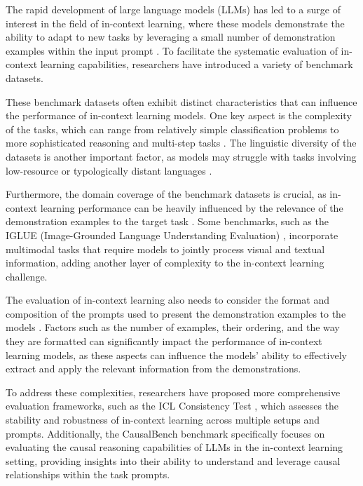 \documentclass[11pt]{article}
\begin{document}
The rapid development of large language models (LLMs) has led to a surge of interest in the field of in-context learning, where these models demonstrate the ability to adapt to new tasks by leveraging a small number of demonstration examples within the input prompt \cite{ref278,ref4}. To facilitate the systematic evaluation of in-context learning capabilities, researchers have introduced a variety of benchmark datasets.

These benchmark datasets often exhibit distinct characteristics that can influence the performance of in-context learning models. One key aspect is the complexity of the tasks, which can range from relatively simple classification problems to more sophisticated reasoning and multi-step tasks \cite{ref279,ref280}. The linguistic diversity of the datasets is another important factor, as models may struggle with tasks involving low-resource or typologically distant languages \cite{ref281}.

Furthermore, the domain coverage of the benchmark datasets is crucial, as in-context learning performance can be heavily influenced by the relevance of the demonstration examples to the target task \cite{ref282}. Some benchmarks, such as the IGLUE (Image-Grounded Language Understanding Evaluation) \cite{ref245}, incorporate multimodal tasks that require models to jointly process visual and textual information, adding another layer of complexity to the in-context learning challenge.

The evaluation of in-context learning also needs to consider the format and composition of the prompts used to present the demonstration examples to the models \cite{ref48,ref15}. Factors such as the number of examples, their ordering, and the way they are formatted can significantly impact the performance of in-context learning models, as these aspects can influence the models' ability to effectively extract and apply the relevant information from the demonstrations.

To address these complexities, researchers have proposed more comprehensive evaluation frameworks, such as the ICL Consistency Test \cite{ref283}, which assesses the stability and robustness of in-context learning across multiple setups and prompts. Additionally, the CausalBench \cite{ref284} benchmark specifically focuses on evaluating the causal reasoning capabilities of LLMs in the in-context learning setting, providing insights into their ability to understand and leverage causal relationships within the task prompts.
\end{document}
